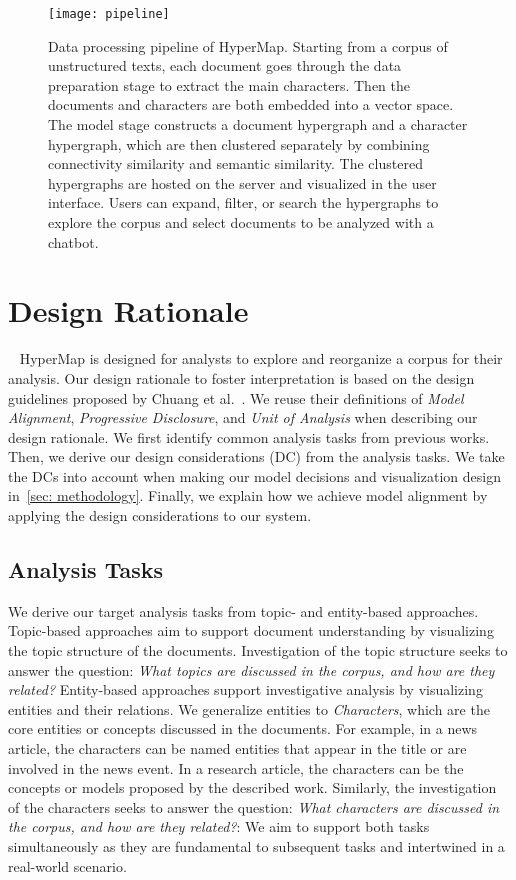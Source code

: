 \begin{figure*}[htbp]
 \centering %
 \texttt{[image: pipeline]}
 \caption{Data processing pipeline of HyperMap. 
 Starting from a corpus of unstructured texts, each document goes through the data preparation stage to extract the main characters.
 Then the documents and characters are both embedded into a vector space.
 The model stage constructs a document hypergraph and a character hypergraph, which are then clustered separately by combining connectivity similarity and semantic similarity.
 The clustered hypergraphs are hosted on the server and visualized in the user interface.
 Users can expand, filter, or search the hypergraphs to explore the corpus and select documents to be analyzed with a chatbot.
  }
\label{fig:pipeline}
\end{figure*}

\section{Design Rationale}~\label{sec: design_rationale}
HyperMap is designed for analysts to explore and reorganize a corpus for their analysis.
Our design rationale to foster interpretation is based on the design guidelines proposed by Chuang et al.~\cite{chuang2012interpretation}.
We reuse their definitions of \textit{Model Alignment}, \textit{Progressive Disclosure}, and \textit{Unit of Analysis} when describing our design rationale.
We first identify common analysis tasks from previous works.
Then, we derive our design considerations (DC) from the analysis tasks.
We take the DCs into account when making our model decisions and visualization design in~\autoref{sec: methodology}.
Finally, we explain how we achieve model alignment by applying the design considerations to our system.

\subsection{Analysis Tasks}
We derive our target analysis tasks from topic- and entity-based approaches.
Topic-based approaches aim to support document understanding by visualizing the topic structure of the documents.
Investigation of the topic structure seeks to answer the question: \textit{What topics are discussed in the corpus, and how are they related?}
Entity-based approaches support investigative analysis by visualizing entities and their relations.
We generalize entities to \textit{Characters}, which are the core entities or concepts discussed in the documents.
For example, in a news article, the characters can be named entities that appear in the title or are involved in the news event.
In a research article, the characters can be the concepts or models proposed by the described work.
Similarly, the investigation of the characters seeks to answer the question: \textit{What characters are discussed in the corpus, and how are they related?}: 
We aim to support both tasks simultaneously as they are fundamental to subsequent tasks and intertwined in a real-world scenario.

